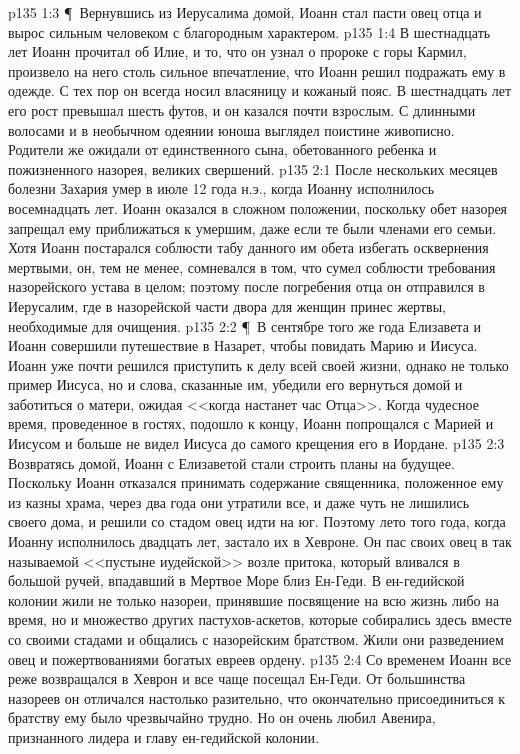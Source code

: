\vs p135 1:3 \P\ Вернувшись из Иерусалима домой, Иоанн стал пасти овец отца и вырос сильным человеком с благородным характером.
\vs p135 1:4 В шестнадцать лет Иоанн прочитал об Илие, и то, что он узнал о пророке с горы Кармил, произвело на него столь сильное впечатление, что Иоанн решил подражать ему в одежде. С тех пор он всегда носил власяницу и кожаный пояс. В шестнадцать лет его рост превышал шесть футов, и он казался почти взрослым. С длинными волосами и в необычном одеянии юноша выглядел поистине живописно. Родители же ожидали от единственного сына, обетованного ребенка и пожизненного назорея, великих свершений.
\vs p135 2:1 После нескольких месяцев болезни Захария умер в июле 12 года н.э., когда Иоанну исполнилось восемнадцать лет. Иоанн оказался в сложном положении, поскольку обет назорея запрещал ему приближаться к умершим, даже если те были членами его семьи. Хотя Иоанн постарался соблюсти табу данного им обета избегать осквернения мертвыми, он, тем не менее, сомневался в том, что сумел соблюсти требования назорейского устава в целом; поэтому после погребения отца он отправился в Иерусалим, где в назорейской части двора для женщин принес жертвы, необходимые для очищения.
\vs p135 2:2 \P\ В сентябре того же года Елизавета и Иоанн совершили путешествие в Назарет, чтобы повидать Марию и Иисуса. Иоанн уже почти решился приступить к делу всей своей жизни, однако не только пример Иисуса, но и слова, сказанные им, убедили его вернуться домой и заботиться о матери, ожидая <<когда настанет час Отца>>. Когда чудесное время, проведенное в гостях, подошло к концу, Иоанн попрощался с Марией и Иисусом и больше не видел Иисуса до самого крещения его в Иордане.
\vs p135 2:3 Возвратясь домой, Иоанн с Елизаветой стали строить планы на будущее. Поскольку Иоанн отказался принимать содержание священника, положенное ему из казны храма, через два года они утратили все, и даже чуть не лишились своего дома, и решили со стадом овец идти на юг. Поэтому лето того года, когда Иоанну исполнилось двадцать лет, застало их в Хевроне. Он пас своих овец в так называемой <<пустыне иудейской>> возле притока, который вливался в большой ручей, впадавший в Мертвое Море близ Ен\hyp{}Геди. В ен\hyp{}гедийской колонии жили не только назореи, принявшие посвящение на всю жизнь либо на время, но и множество других пастухов\hyp{}аскетов, которые собирались здесь вместе со своими стадами и общались с назорейским братством. Жили они разведением овец и пожертвованиями богатых евреев ордену.
\vs p135 2:4 Со временем Иоанн все реже возвращался в Хеврон и все чаще посещал Ен\hyp{}Геди. От большинства назореев он отличался настолько разительно, что окончательно присоединиться к братству ему было чрезвычайно трудно. Но он очень любил Авенира, признанного лидера и главу ен\hyp{}гедийской колонии.
